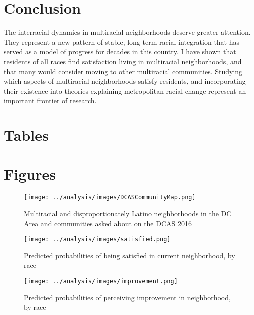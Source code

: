 \documentclass{baderart}
\begin{document}
\section{Conclusion}
The interracial dynamics in multiracial neighborhoods deserve greater attention. They represent a new pattern of stable, long-term racial integration that has served as a model of progress for decades in this country. I have shown that residents of all races find satisfaction living in multiracial neighborhoods, and that many would consider moving to other multiracial communities. Studying which aspects of multiracial neighborhoods satisfy residents, and incorporating their existence into theories explaining metropolitan racial change represent an important frontier of research.  


\clearpage
\singlespace
\singlespace
 	
	


\clearpage 

\section{Tables}
















\clearpage
\section{Figures}

\begin{figure}[h!]
\caption{Multiracial and disproportionately Latino neighborhoods in the DC Area and communities asked about on the DCAS 2016}
\label{fig:map}
\centering
\texttt{[image: ../analysis/images/DCASCommunityMap.png]}
\end{figure}

\begin{sidewaysfigure}
\caption{Predicted probabilities of being satisfied in current neighborhood, by race}
\label{fig:satisfaction}
\centering
\texttt{[image: ../analysis/images/satisfied.png]}
\end{sidewaysfigure}

\begin{sidewaysfigure}
\caption{Predicted probabilities of perceiving improvement in neighborhood, by race}
\label{fig:improvement}
\centering
\texttt{[image: ../analysis/images/improvement.png]}
\end{sidewaysfigure}
\end{document}
